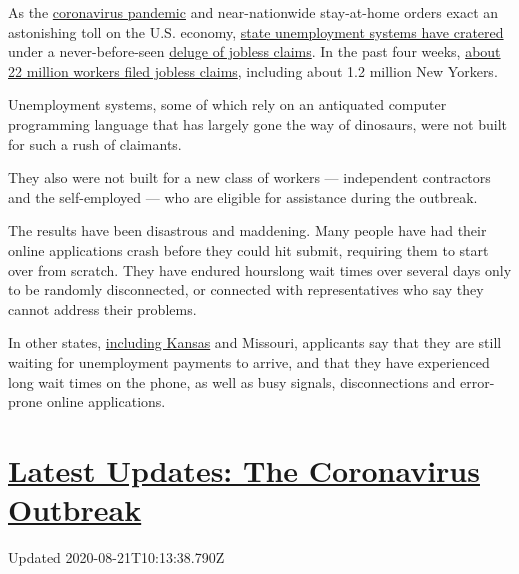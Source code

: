 As the
\href{https://www.nytimes3xbfgragh.onion/2020/04/15/nyregion/coronavirus-face-masks-andrew-cuomo.html}{coronavirus
pandemic} and near-nationwide stay-at-home orders exact an astonishing
toll on the U.S. economy,
\href{https://www.nytimes3xbfgragh.onion/2020/04/04/nyregion/coronavirus-ny-unemployment-benefits.html}{state
unemployment systems have cratered} under a never-before-seen
\href{https://www.nytimes3xbfgragh.onion/2020/04/02/business/economy/coronavirus-unemployment-claims.html}{deluge
of jobless claims}. In the past four weeks,
\href{https://www.nytimes3xbfgragh.onion/2020/04/16/business/economy/unemployment-numbers-coronavirus.html}{about
22 million workers filed jobless claims}, including about 1.2 million
New Yorkers.

Unemployment systems, some of which rely on an antiquated computer
programming language that has largely gone the way of dinosaurs, were
not built for such a rush of claimants.

They also were not built for a new class of workers --- independent
contractors and the self-employed --- who are eligible for assistance
during the outbreak.

The results have been disastrous and maddening. Many people have had
their online applications crash before they could hit submit, requiring
them to start over from scratch. They have endured hourslong wait times
over several days only to be randomly disconnected, or connected with
representatives who say they cannot address their problems.

In other states,
\href{https://www.kansascity.com/news/local/article242013491.html}{including
Kansas} and Missouri, applicants say that they are still waiting for
unemployment payments to arrive, and that they have experienced long
wait times on the phone, as well as busy signals, disconnections and
error-prone online applications.

\hypertarget{latest-updates-the-coronavirus-outbreak}{%
\section{\texorpdfstring{\href{https://www.nytimes3xbfgragh.onion/2020/08/21/world/covid-19-coronavirus.html?action=click\&pgtype=Article\&state=default\&region=MAIN_CONTENT_1\&context=storylines_live_updates}{Latest
Updates: The Coronavirus
Outbreak}}{Latest Updates: The Coronavirus Outbreak}}\label{latest-updates-the-coronavirus-outbreak}}

Updated 2020-08-21T10:13:38.790Z

